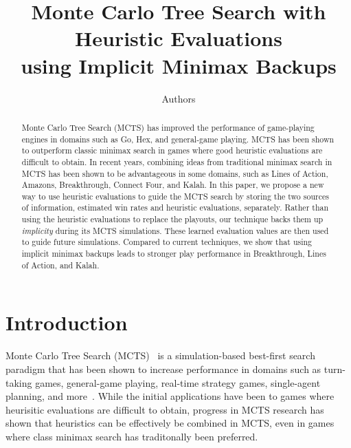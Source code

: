 \documentclass[letterpaper]{article}
\begin{document}
%
\title{Monte Carlo Tree Search with Heuristic Evaluations\\using Implicit Minimax Backups}
\author{Authors}

\maketitle

\begin{abstract}
Monte Carlo Tree Search (MCTS) has improved the performance of game-playing engines in 
domains such as Go, Hex, and general-game playing. MCTS has been shown to outperform 
classic minimax search in games where good heuristic evaluations are difficult to obtain. 
In recent years, combining 
ideas from traditional minimax search in MCTS has been shown to be advantageous in some domains,
such as Lines of Action, Amazons, Breakthrough, Connect Four, and Kalah. In this paper, we propose 
a new way to use heuristic evaluations to guide the MCTS search by storing the two sources of 
information, estimated win rates and heuristic evaluations, separately. 
Rather than using the heuristic evaluations to replace the playouts, 
our technique backs them up {\it implicity} during its MCTS simulations. 
These learned evaluation values are then used to guide future simulations. 
Compared to current techniques, we show that using implicit minimax backups  
leads to stronger play performance in Breakthrough, Lines of Action, and Kalah. 
\end{abstract}


\section{Introduction}

Monte Carlo Tree Search (MCTS)~\cite{Coulom06Efficient,Kocsis06Bandit} is a simulation-based best-first
search paradigm that has been shown to increase performance in domains such as turn-taking games, 
general-game playing, real-time strategy games, single-agent planning, and more~\cite{mctssurvey}. 
While the initial applications have been to games where heurisitic evaluations are difficult to obtain, 
progress in MCTS research has shown that heuristics can be effectively be combined in MCTS, even in games 
where class minimax search has traditonally been preferred. 
\end{document}
